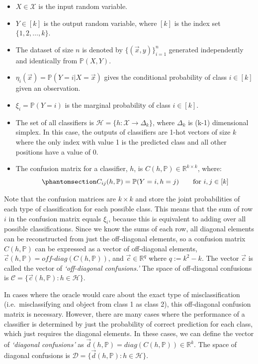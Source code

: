 \documentclass[
  letterpaper,
  numbers=noenddot,
  DIV=11]{scrreprt}
\theoremstyle{plain}
\theoremstyle{definition}
\theoremstyle{plain}
\theoremstyle{remark}
\begin{document}
\begin{itemize}
\item
  \(X \in \mathcal{X}\) is the input random variable.
\item
  \(Y \in [k]\) is the output random variable, where \([k]\) is the
  index set \(\{1, 2, \dots, k\}\).
\item
  The dataset of size \(n\) is denoted by \(\{(\vec{x}, y)\}_{i=1}^n\)
  generated independently and identically from \(\mathbb{P}(X, Y)\).
\item
  \(\eta_i(\vec{x}) = \mathbb{P}(Y=i | X=\vec{x})\) gives the
  conditional probability of class \(i \in [k]\) given an observation.
\item
  \(\xi_i = \mathbb{P}(Y=i)\) is the marginal probability of class
  \(i \in [k]\).
\item
  The set of all classifiers is
  \(\mathcal{H} = \{h : \mathcal{X} \rightarrow \Delta_k\}\), where
  \(\Delta_k\) is (k-1) dimensional simplex. In this case, the outputs
  of classifiers are 1-hot vectors of size \(k\) where the only index
  with value 1 is the predicted class and all other positions have a
  value of 0.
\item
  The confusion matrix for a classifier, \(h\), is
  \(C(h, \mathbb{P}) \in \mathbb{R}^{k \times k}\), where:
  \begin{equation}\phantomsection\label{eq-eq3.59}{C_{ij}(h, \mathbb{P}) = \mathbb{P}(Y=i, h=j) \text{\qquad for } i, j \in [k]}\end{equation}
\end{itemize}

Note that the confusion matrices are \(k\times k\) and store the joint
probabilities of each type of classification for each possible class.
This means that the sum of row \(i\) in the confusion matrix equals
\(\xi_i\), because this is equivalent to adding over all possible
classifications. Since we know the sums of each row, all diagonal
elements can be reconstructed from just the off-diagonal elements, so a
confusion matrix \(C(h, \mathbb{P})\) can be expressed as a vector of
off-diagonal elements,
\(\vec{c}(h, \mathbb{P}) = \textit{off-diag}(C(h, \mathbb{P}))\), and
\(\vec{c} \in \mathbb{R}^q\) where \(q := k^2 - k\). The vector
\(\vec{c}\) is called the vector of \emph{`off-diagonal confusions.'}
The space of off-diagonal confusions is
\(\mathcal{C} = \{\vec{c}(h, \mathbb{P}) : h \in \mathcal{H}\}\).

In cases where the oracle would care about the exact type of
misclassification (i.e.~misclassifying and object from class 1 as class
2), this off-diagonal confusion matrix is necessary. However, there are
many cases where the performance of a classifier is determined by just
the probability of correct prediction for each class, which just
requires the diagonal elements. In these cases, we can define the vector
of \emph{`diagonal confusions'} as
\(\vec{d}(h, \mathbb{P}) = \textit{diag}(C(h, \mathbb{P})) \in \mathbb{R}^k\).
The space of diagonal confusions is
\(\mathcal{D} = \{\vec{d}(h, \mathbb{P}) : h \in \mathcal{H}\}\).
\end{document}
